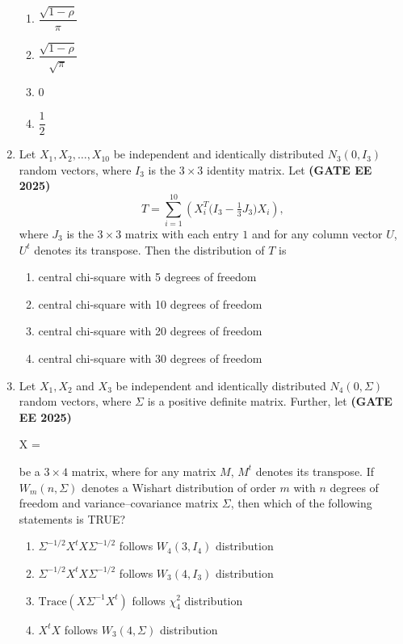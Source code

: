 \documentclass[journal,12pt,onecolumn]{IEEEtran}
\theoremstyle{remark}
\begin{document}
\begin{enumerate}
\begin{enumerate}
    \item $\dfrac{\sqrt{1-\rho}}{\pi}$
    \item $\dfrac{\sqrt{1-\rho}}{\sqrt{\pi}}$
    \item $0$
    \item $\dfrac{1}{2}$
\end{enumerate}

\item Let $X_1, X_2, \ldots, X_{10}$ be independent and identically distributed $N_3(0, I_3)$ random vectors, where $I_3$ is the $3 \times 3$ identity matrix. Let \hfill \textbf{(GATE EE 2025)}
\[
T = \sum_{i=1}^{10} \left( X_i^T \Big( I_3 - \tfrac{1}{3} J_3 \Big) X_i \right),
\]
where $J_3$ is the $3 \times 3$ matrix with each entry $1$ and for any column vector $U$, $U^t$ denotes its transpose. Then the distribution of $T$ is

\begin{enumerate}
    \item central chi-square with 5 degrees of freedom
    \item central chi-square with 10 degrees of freedom
    \item central chi-square with 20 degrees of freedom
    \item central chi-square with 30 degrees of freedom
\end{enumerate}

\item Let $X_1, X_2$ and $X_3$ be independent and identically distributed 
$N_4(0, \Sigma)$ random vectors, where $\Sigma$ is a positive definite matrix. 
Further, let  \hfill \textbf{(GATE EE 2025)}

X = 

be a $3 \times 4$ matrix, where for any matrix $M$, $M^t$ denotes its transpose. 
If $W_m(n, \Sigma)$ denotes a Wishart distribution of order $m$ with $n$ degrees 
of freedom and variance--covariance matrix $\Sigma$, then which of the following 
statements is TRUE?  

\begin{enumerate}
    \item $\Sigma^{-1/2} X^t X \Sigma^{-1/2}$ follows $W_4(3, I_4)$ distribution
    \item $\Sigma^{-1/2} X^t X \Sigma^{-1/2}$ follows $W_3(4, I_3)$ distribution
    \item $\text{Trace}(X \Sigma^{-1} X^t)$ follows $\chi^2_4$ distribution
    \item $X^t X$ follows $W_3(4, \Sigma)$ distribution
\end{enumerate}


\end{enumerate}
\end{document}
